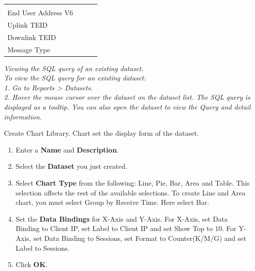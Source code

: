 \begin{description}
\begin{longtable}{p{}|p{}|p{}|p{}}
{                                                                                                    End User Address V4\\
                                                                                                    End User Address V6\\
                                                                                                    Uplink TEID\\
                                                                                                    Downlink TEID\\
                                                                                                    Message Type}  \\ \hline                                                                                                                                                                                                                                                                                                                                                                                
    \end{longtable}

    \item[] \notemark\textit{Viewing the SQL query of an existing dataset.\\
                            To view the SQL query for an existing dataset: \\
                            1. Go to Reports > Datasets.\\ 
                            2. Hover the mouse cursor over the dataset on the dataset list. The SQL query is displayed as a tooltip. You can also open the dataset to view the Query and detail information.}

    \item[STEP 2.]	Create Chart Library. Chart set the display form of the dataset.
    \begin{enumerate}
        \item Enter a \textbf{Name} and \textbf{Description}.
        \item Select the \textbf{Dataset} you just created.
        \item Select \textbf{Chart Type} from the following: Line, Pie, Bar, Area and Table. This selection affects the rest of the available selections. To create Line and Area chart, you must select Group by Receive Time. Here select Bar. 
        \item Set the \textbf{Data Bindings} for X-Axis and Y-Axis. For X-Axis, set Data Binding to Client IP, set Label to Client IP and set Show Top to 10. For Y-Axis, set Data Binding to Sessions, set Format to Counter(K/M/G) and set Label to Sessions.
        \item Click \textbf{OK}.
    \end{enumerate}


\end{description}
